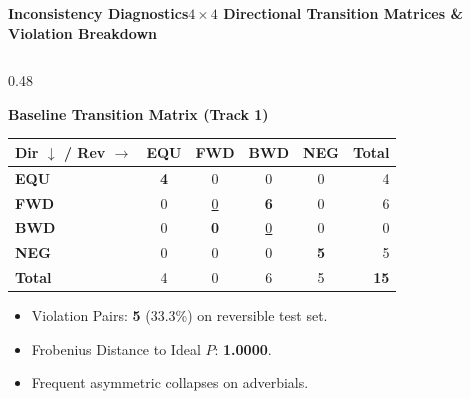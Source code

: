 \documentclass[aspectratio=169,10pt]{beamer}
\begin{document}
\begin{frame}{\textbf{Inconsistency Diagnostics}}{\textbf{$4 \times 4$ Directional Transition Matrices \& Violation Breakdown}}
  \begin{columns}[T]
    \begin{column}{0.48\textwidth}
      \begin{block}{\textbf{Baseline Transition Matrix (Track 1)}}
        \centering
        \footnotesize
        \vspace{0.1cm}
        \begin{tabular}{l|cccc|r}
          \toprule
          \textbf{Dir $\downarrow$ / Rev $\rightarrow$} & \textbf{EQU} & \textbf{FWD} & \textbf{BWD} & \textbf{NEG} & \textbf{Total} \\
          \midrule
          \textbf{EQU} & \textbf{4} & 0 & 0 & 0 & 4 \\
          \textbf{FWD} & 0 & \underline{0} & \textbf{6} & 0 & 6 \\
          \textbf{BWD} & 0 & \textbf{0} & \underline{0} & 0 & 0 \\
          \textbf{NEG} & 0 & 0 & 0 & \textbf{5} & 5 \\
          \midrule
          \textbf{Total} & 4 & 0 & 6 & 5 & \textbf{15} \\
          \bottomrule
        \end{tabular}
        \vspace{0.1cm}
        \begin{itemize}
          \item Violation Pairs: \textbf{5} (33.3\%) on reversible test set.
          \item Frobenius Distance to Ideal $P$: \textbf{1.0000}.
          \item Frequent asymmetric collapses on adverbials.
        \end{itemize}
      \end{block}
    \end{column}


\end{columns}
\end{frame}
\end{document}
